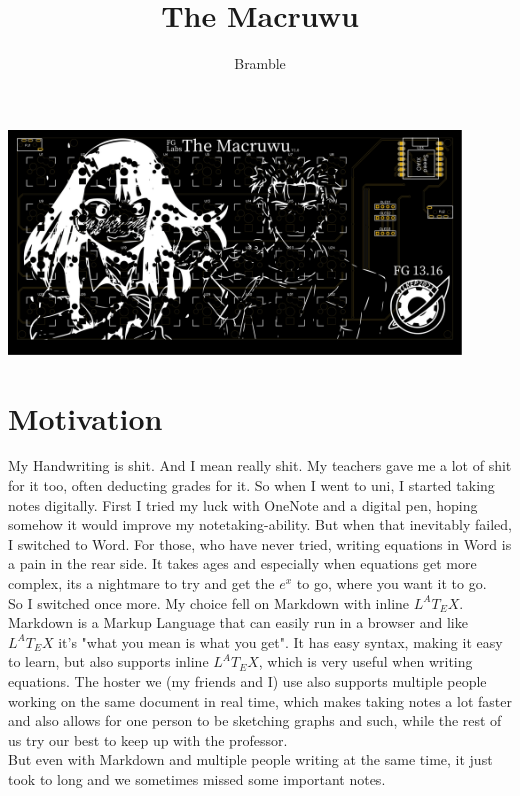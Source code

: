\documentclass[english, 12pt]{scrartcl}
\title{\fontfamily{}\selectfont The Macruwu}
\author{Bramble}
\date{}
\begin{document}
	\maketitle
	\includegraphics[width=0.9\textwidth]{Macruwu PCB_5}
	\tableofcontents
	\newpage
	\section{Motivation}
	My Handwriting is shit. And I mean really shit. My teachers gave me a lot of shit for it too, often deducting grades for it. So when I went to uni, I started taking notes digitally. First I tried my luck with OneNote and a digital pen, hoping somehow it would improve my notetaking-ability. But when that inevitably failed, I switched to Word. For those, who have never tried, writing equations in Word is a pain in the rear side. It takes ages and especially when equations get more complex, its a nightmare to try and get the $e^{x}$ to go, where you want it to go.\\
	So I switched once more. My choice fell on Markdown with inline $L^AT_EX$. Markdown is a Markup Language that can easily run in a browser and like $L^AT_EX$ it's "what you mean is what you get". It has easy syntax, making it easy to learn, but also supports inline $L^AT_EX$, which is very useful when writing equations. The hoster we (my friends and I) use also supports multiple people working on the same document in real time, which makes taking notes a lot faster and also allows for one person to be sketching graphs and such, while the rest of us try our best to keep up with the professor.\\
	But even with Markdown and multiple people writing at the same time, it just took to long and we sometimes missed some important notes.\\
\end{document}

